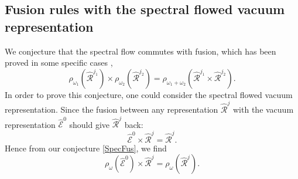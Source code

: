 \documentclass[10pt,a4paper]{article}
\numberwithin{equation}{section}
\begin{document}
\subsection{Fusion rules with the spectral flowed vacuum representation}
We conjecture that the spectral flow commutes with fusion, which has been proved in some specific cases \cite{Gaberdiel:2001ny}, 
\begin{equation}
    \rho_{\omega_{1}} \left(\widehat{\mathcal{R}}^{j_{1}}\right) \times \rho_{\omega_{2}} \left(\widehat{\mathcal{R}}^{j_{2}}\right) = \rho_{\omega_{1} + \omega_{2}} \left(\widehat{\mathcal{R}}^{j_{1}}\times \widehat{\mathcal{R}}^{j_{2}} \right). \label{SpecFus}
\end{equation}
In order to prove this conjecture, one could consider the spectral flowed vacuum representation. Since the fusion between any 
representation $\widehat{\mathcal{R}}^{j}$ with the vacuum representation $\widehat{\mathcal{E}}^{0}$ should give 
$\widehat{\mathcal{R}}^{j}$ back: 
\begin{equation}
    \widehat{\mathcal{E}}^{0} \times \widehat{\mathcal{R}}^{j} = \widehat{\mathcal{R}}^{j}.
\end{equation}
Hence from our conjecture \eqref{SpecFus}, we find 
\begin{equation}
    \rho_{\omega} \left( \widehat{\mathcal{E}}^{0} \right) \times \widehat{\mathcal{R}}^{j} = \rho_{\omega} \left( \widehat{\mathcal{R}}^{j} \right).
\end{equation}
\end{document}
